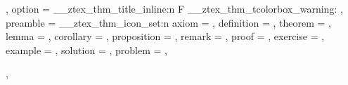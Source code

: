 {{{\begin{tcolorbox}
{        },
      ]\ztex@llapnote{\zthmtitle*}
    },
    end = {\end{tcolorbox}},
    option = {
      \__ztex_thm_title_inline:n {F}
      \__ztex_thm_tcolorbox_warning:
    },
    preamble = {
      \zthmtitleformat*{\bfseries
        \zthmname\ \zthmnumber
        \zthmnotemptyTF{}{\\}
        \zthmnote{}{}
      }
      \newcommand{\ztex@llapnote}[1]{
        \mbox{}\llap{
        \adjustbox{set~height=0pt, set~depth=0pt}{
          \parbox[t]{2.85cm}{\raggedleft #1}}\hspace*{.75em}}
      }
      \__ztex_thm_icon_set:n 
        {
          axiom       = ,
          definition  = , 
          theorem     = , 
          lemma       = ,
          corollary   = , 
          proposition = , 
          remark      = ,
          proof       = , 
          exercise    = ,
          example     = ,
          solution    = , 
          problem     = ,
        }
    }
  },
}

